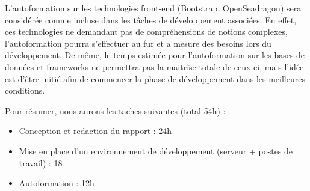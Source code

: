     L'autoformation sur les technologies front-end (Bootstrap, OpenSeadragon) sera considérée comme incluse dans les tâches de développement associées. En effet, ces technologies ne demandant pas de compréhensions de notions complexes, l'autoformation pourra s'effectuer au fur et a mesure des besoins lors du développement.
    De même, le temps estimée pour l'autoformation sur les bases de données et frameworks ne permettra pas la maitrîse totale de ceux-ci, mais l'idée est d'être initié afin de commencer la phase de développement dans les meilleures conditions.

Pour résumer, nous aurons les taches suivantes (total 54h) :
\begin{itemize}
\item Conception et redaction du rapport : 24h
\item Mise en place d'un environnement de développement (serveur + postes de travail) : 18
\item Autoformation : 12h
\end{itemize}